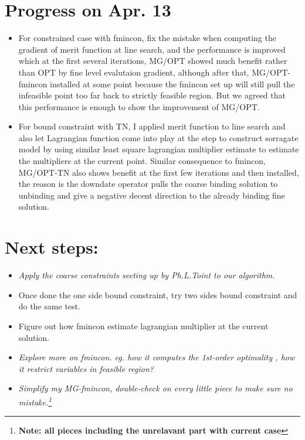 \documentclass[10pt]{article}
\begin{document}
\section{Progress on Apr. 13}
\begin{itemize}
\item For constrained case with fmincon, fix the mistake when computing the gradient of merit function at line search, and the performance is improved which at the first several iterations, MG/OPT showed much benefit rather than OPT by fine level evalutaion gradient, although after that, MG/OPT-fmincon installed at some point because the fmincon set up will still pull the infeasible point too far back to strictly feasible region. But we agreed that this performance is enough to show the improvement of MG/OPT.\\

\item For bound constraint with TN, I applied merit function to line search and also let Lagrangian function come into play at the step to construct sorragate model by using similar least square lagrangian multiplier estimate to estimate the multipliers at the current point. Similar consequence to fmincon, MG/OPT-TN also shows benefit at the first few iterations and then installed, the reason is the downdate operator pulls the coarse binding solution to unbinding and give a negative decent direction to the already binding fine solution.  
\end{itemize}

\section {Next steps:}
\begin{itemize}
\item{\em Apply the coarse constraints seeting up by Ph.L.Toint to our algorithm.}
\item Once done the one side bound constraint, try two sides bound constraint and do the same test.
\item  Figure out how fmincon estimate lagrangian multiplier at the current solution.
\item{\em Explore more on fmincon. eg. how it computes the 1st-order optimality , how it restrict variables in feasible region?}
\item{\em Simplify my MG-fmincon, double-check on every little piece to make sure no mistake.\footnote{\bf Note: all pieces including the unrelavant part with current case}}

\end{itemize}
\end{document}
